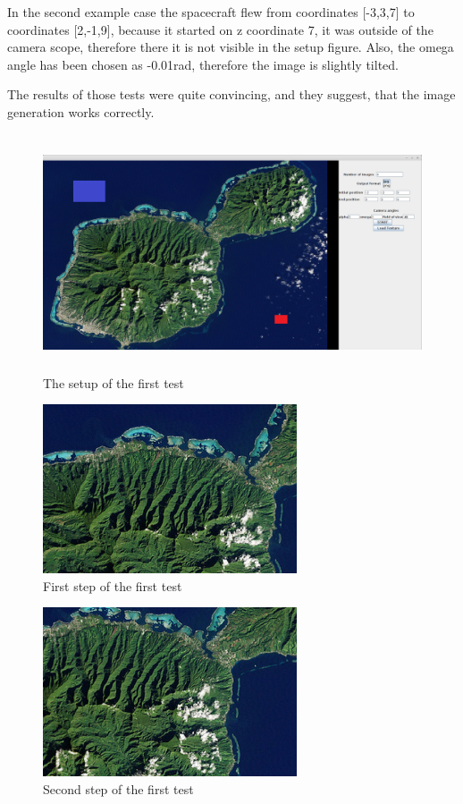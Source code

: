 \documentclass[english,12pt,a4paper,pdftex,elec,utf8]{aaltothesis}
\begin{document}
In the second example case the spacecraft flew from coordinates [-3,3,7] to coordinates [2,-1,9], because it started on z coordinate 7, it was outside of the camera scope, therefore there it is not visible in the setup figure.
Also, the omega angle has been chosen as -0.01rad, therefore the image is slightly tilted.

The results of those tests were quite convincing, and they suggest, that the image generation works correctly.

\begin{figure}[htb]
\centering \includegraphics[height=7cm]{screenTest1.png}
\caption{The setup of the first test\label{screenTest1}}
\end{figure}

\begin{figure}[htb]
\centering \includegraphics[height=5cm]{screenshot00.jpg}
\caption{First step of the first test\label{screenshot0Test1}}
\end{figure}

\begin{figure}[htb]
\centering \includegraphics[height=5cm]{screenshot10.jpg}
\caption{Second step of the first test\label{screenshot1Test1}}
\end{figure}
\end{document}
